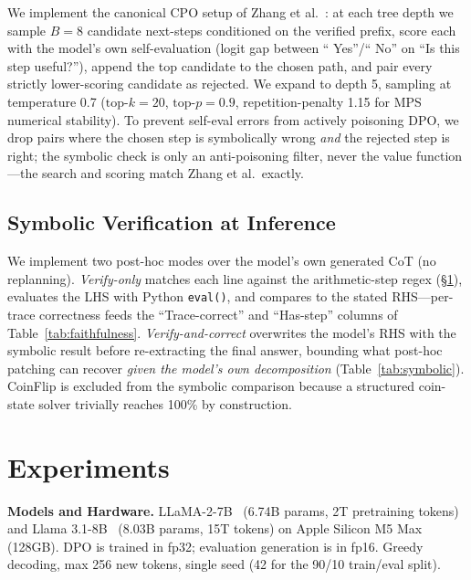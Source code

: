 \documentclass{article}
\begin{document}
We implement the canonical CPO setup of Zhang et al.~\cite{zhang2024cpo}: at each tree depth we sample $B{=}8$ candidate next-steps conditioned on the verified prefix, score each with the model's own self-evaluation (logit gap between `` Yes''/`` No'' on ``Is this step useful?''), append the top candidate to the chosen path, and pair every strictly lower-scoring candidate as rejected. We expand to depth 5, sampling at temperature 0.7 ($\textrm{top-}k{=}20$, $\textrm{top-}p{=}0.9$, repetition-penalty 1.15 for MPS numerical stability). To prevent self-eval errors from actively poisoning DPO, we drop pairs where the chosen step is symbolically wrong \emph{and} the rejected step is right; the symbolic check is only an anti-poisoning filter, never the value function---the search and scoring match Zhang et al.\ exactly.

\subsection{Symbolic Verification at Inference}
\label{sec:method-symbolic}

We implement two post-hoc modes over the model's own generated CoT (no replanning). \emph{Verify-only} matches each line against the arithmetic-step regex (§\ref{sec:experiments}), evaluates the LHS with Python \texttt{eval()}, and compares to the stated RHS---per-trace correctness feeds the ``Trace-correct'' and ``Has-step'' columns of Table~\ref{tab:faithfulness}. \emph{Verify-and-correct} overwrites the model's RHS with the symbolic result before re-extracting the final answer, bounding what post-hoc patching can recover \emph{given the model's own decomposition} (Table~\ref{tab:symbolic}). CoinFlip is excluded from the symbolic comparison because a structured coin-state solver trivially reaches 100\% by construction.

\section{Experiments}
\label{sec:experiments}

\textbf{Models and Hardware.} LLaMA-2-7B~\cite{touvron2023llama2} (6.74B params, 2T pretraining tokens) and Llama 3.1-8B~\cite{grattafiori2024llama3} (8.03B params, 15T tokens) on Apple Silicon M5 Max (128GB). DPO is trained in fp32; evaluation generation is in fp16. Greedy decoding, max 256 new tokens, single seed (42 for the 90/10 train/eval split).
\end{document}
